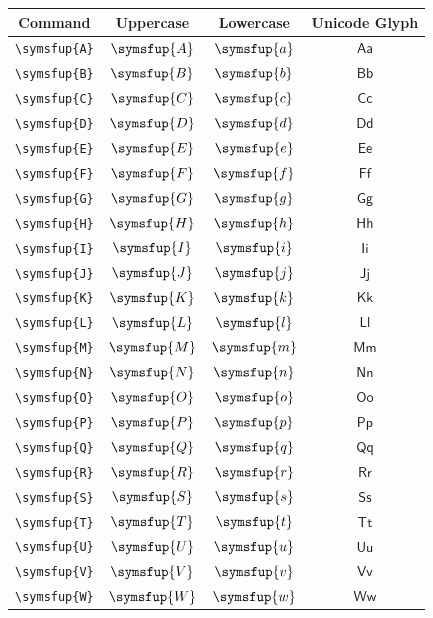 \documentclass[12pt,a4paper]{article}
\begin{document}
\begin{longtable}{|c|c|c|c|}
\hline
\textbf{Command} & \textbf{Uppercase} & \textbf{Lowercase} & \textbf{Unicode Glyph} \\
\hline
\verb|\symsfup{A}| & $\symsfup{A}$ & $\symsfup{a}$ & $ 𝖠 𝖺 $ \\
\verb|\symsfup{B}| & $\symsfup{B}$ & $\symsfup{b}$ & $ 𝖡 𝖻 $ \\
\verb|\symsfup{C}| & $\symsfup{C}$ & $\symsfup{c}$ & $ 𝖢 𝖼 $ \\
\verb|\symsfup{D}| & $\symsfup{D}$ & $\symsfup{d}$ & $ 𝖣 𝖽 $ \\
\verb|\symsfup{E}| & $\symsfup{E}$ & $\symsfup{e}$ & $ 𝖤 𝖾 $ \\
\verb|\symsfup{F}| & $\symsfup{F}$ & $\symsfup{f}$ & $ 𝖥 𝖿 $ \\
\verb|\symsfup{G}| & $\symsfup{G}$ & $\symsfup{g}$ & $ 𝖦 𝗀 $ \\
\verb|\symsfup{H}| & $\symsfup{H}$ & $\symsfup{h}$ & $ 𝖧 𝗁 $ \\
\verb|\symsfup{I}| & $\symsfup{I}$ & $\symsfup{i}$ & $ 𝖨 𝗂 $ \\
\verb|\symsfup{J}| & $\symsfup{J}$ & $\symsfup{j}$ & $ 𝖩 𝗃 $ \\
\verb|\symsfup{K}| & $\symsfup{K}$ & $\symsfup{k}$ & $ 𝖪 𝗄 $ \\
\verb|\symsfup{L}| & $\symsfup{L}$ & $\symsfup{l}$ & $ 𝖫 𝗅 $ \\
\verb|\symsfup{M}| & $\symsfup{M}$ & $\symsfup{m}$ & $ 𝖬 𝗆 $ \\
\verb|\symsfup{N}| & $\symsfup{N}$ & $\symsfup{n}$ & $ 𝖭 𝗇 $ \\
\verb|\symsfup{O}| & $\symsfup{O}$ & $\symsfup{o}$ & $ 𝖮 𝗈 $ \\
\verb|\symsfup{P}| & $\symsfup{P}$ & $\symsfup{p}$ & $ 𝖯 𝗉 $ \\
\verb|\symsfup{Q}| & $\symsfup{Q}$ & $\symsfup{q}$ & $ 𝖰 𝗊 $ \\
\verb|\symsfup{R}| & $\symsfup{R}$ & $\symsfup{r}$ & $ 𝖱 𝗋 $ \\
\verb|\symsfup{S}| & $\symsfup{S}$ & $\symsfup{s}$ & $ 𝖲 𝗌 $ \\
\verb|\symsfup{T}| & $\symsfup{T}$ & $\symsfup{t}$ & $ 𝖳 𝗍 $ \\
\verb|\symsfup{U}| & $\symsfup{U}$ & $\symsfup{u}$ & $ 𝖴 𝗎 $ \\
\verb|\symsfup{V}| & $\symsfup{V}$ & $\symsfup{v}$ & $ 𝖵 𝗏 $ \\
\verb|\symsfup{W}| & $\symsfup{W}$ & $\symsfup{w}$ & $ 𝖶 𝗐 $ \\

\end{longtable}
\end{document}
